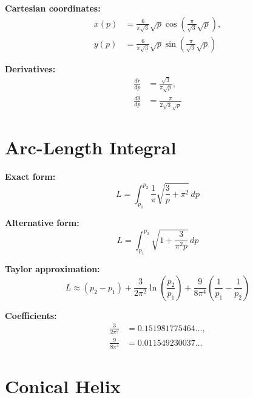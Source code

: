\textbf{Cartesian coordinates:}
\begin{equation}
\begin{aligned}
x(p) &= \frac{6}{\pi\sqrt{3}}\sqrt{p}
       \cos\!\left(\frac{\pi}{\sqrt{3}}\sqrt{p}\right), \\[4pt]
y(p) &= \frac{6}{\pi\sqrt{3}}\sqrt{p}
       \sin\!\left(\frac{\pi}{\sqrt{3}}\sqrt{p}\right)
\end{aligned}
\end{equation}

\textbf{Derivatives:}
\begin{equation}
\begin{aligned}
\frac{dr}{dp} &= \frac{\sqrt{3}}{\pi\sqrt{p}}, \\[4pt]
\frac{d\theta}{dp} &= \frac{\pi}{2\sqrt{3}\sqrt{p}}
\end{aligned}
\end{equation}

\section{Arc-Length Integral}

\textbf{Exact form:}
\begin{equation}
\boxed{
L = \int_{p_1}^{p_2}
\frac{1}{\pi}\sqrt{\frac{3}{p} + \pi^2}\, dp
}
\end{equation}

\textbf{Alternative form:}
\begin{equation}
L = \int_{p_1}^{p_2}
\sqrt{1 + \frac{3}{\pi^2 p}}\, dp
\end{equation}

\textbf{Taylor approximation:}
\begin{equation}
\boxed{
L \approx (p_2 - p_1)
+ \frac{3}{2\pi^2}\ln\!\left(\frac{p_2}{p_1}\right)
+ \frac{9}{8\pi^4}\left(\frac{1}{p_1} - \frac{1}{p_2}\right)
}
\end{equation}

\textbf{Coefficients:}
\begin{equation}
\begin{aligned}
\frac{3}{2\pi^2} &= 0.151981775464\ldots, \\[4pt]
\frac{9}{8\pi^4} &= 0.011549230037\ldots
\end{aligned}
\end{equation}

\section{Conical Helix}

